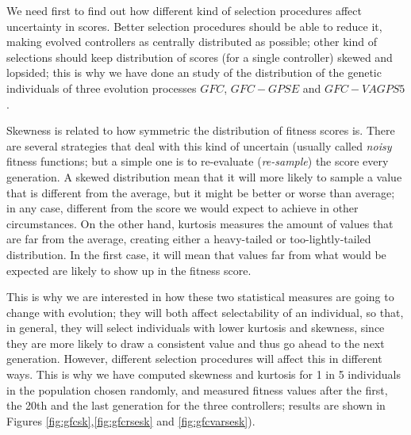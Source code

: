 \documentclass[10pt,journal,compsoc]{IEEEtran}
\begin{document}
We need first to find out how different kind of selection procedures
affect uncertainty in scores. Better selection procedures should be
able to reduce it, making evolved controllers as centrally distributed
as possible; other kind of selections should keep distribution of
scores (for a single controller) skewed and lopsided; this is why we
have done an study of the distribution  of the genetic individuals of
three evolution processes $GFC$, $GFC-GPSE$ and $GFC-VAGPS5$. 


Skewness is related to how symmetric the distribution of fitness
scores is. There are several strategies that deal with this kind of
uncertain (usually called {\em noisy} fitness functions; but a simple
one is to re-evaluate ({\em re-sample}) the score every generation. A
skewed distribution mean that it will more likely to sample a value
that is different from the average, but it might be better or worse
than average; in any case, different from the score we would expect to
achieve in other circumstances. On the other hand, kurtosis measures
the amount of values that are far from the average, creating either a
heavy-tailed or too-lightly-tailed distribution. In the first case, it
will mean that values far from what would be expected are likely to
show up in the fitness score.

This is why we are interested in how these two statistical measures
are going to change with evolution; they will both affect
selectability of an individual, so that, in general, they will select
individuals with lower kurtosis and skewness, since they are more
likely to draw a consistent value and thus go ahead to the next
generation. However, different selection procedures will affect this
in different ways. This is why we have computed skewness and kurtosis for 1 in 5 individuals in the
population chosen randomly, and measured fitness values after the
first, the 20th and the last generation for the three controllers;
results are shown in Figures \ref{fig:gfcsk},\ref{fig:gfcrsesk} and
\ref{fig:gfcvarsesk}). %
\end{document}

